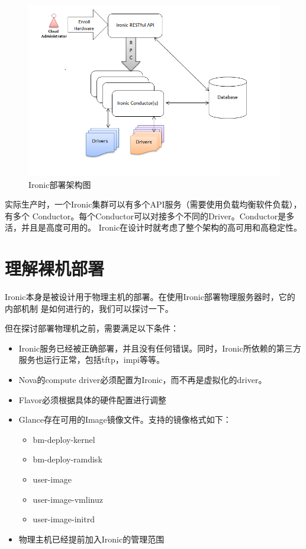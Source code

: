 \begin{figure}[H]
  \centering
  \includegraphics[width=\linewidth]{deployment_architecture.png}
  \caption{Ironic部署架构图\protect\footnotemark}
  \label{fig:deployment_architecture}
\end{figure}

实际生产时，一个Ironic集群可以有多个API服务（需要使用负载均衡软件负载），有多个
Conductor。每个Conductor可以对接多个不同的Driver。Conductor是多活，并且是高度可用的。
Ironic在设计时就考虑了整个架构的高可用和高稳定性。

\section{理解裸机部署}
Ironic本身是被设计用于物理主机的部署。在使用Ironic部署物理服务器时，它的内部机制
是如何进行的，我们可以探讨一下。
\par 但在探讨部署物理机之前，需要满足以下条件：
\begin{itemize}
  \item Ironic服务已经被正确部署，并且没有任何错误。同时，Ironic所依赖的第三方服务也运行正常，包括tftp，impi等等。
  \item Nova的compute driver必须配置为Ironic，而不再是虚拟化的driver。
  \item Flavor必须根据具体的硬件配置进行调整
  \item Glance存在可用的Image镜像文件。支持的镜像格式如下：
  \begin{itemize}
    \item bm-deploy-kernel
    \item bm-deploy-ramdisk
    \item user-image
    \item user-image-vmlinuz
    \item user-image-initrd
  \end{itemize}
  \item 物理主机已经提前加入Ironic的管理范围
\end{itemize}

